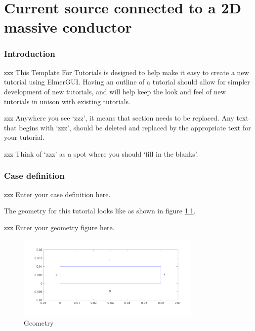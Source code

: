 \chapter{Current source connected to a 2D massive conductor}



\subsection*{Introduction}

zzz This Template For Tutorials is designed to help make it easy to create a new tutorial using ElmerGUI.  Having an outline of a tutorial should allow for simpler development of new tutorials, and will help keep the look and feel of new tutorials in unison with existing tutorials.

zzz Anywhere you see `zzz', it means that section needs to be replaced.  Any text that begins with `zzz', should be deleted and replaced by the appropriate text for your tutorial.  

zzz Think of `zzz' as a spot where you should `fill in the blanks'.



\subsection*{Case definition}


zzz Enter your case definition here.

The geometry for this tutorial looks like as shown in figure \ref{fg:geometry}.

zzz Enter your geometry figure here.

\begin{figure}[H]
\centering
\includegraphics[width=0.8\textwidth]{geometry.png}
\caption{Geometry}\label{fg:geometry}
\end{figure}  

